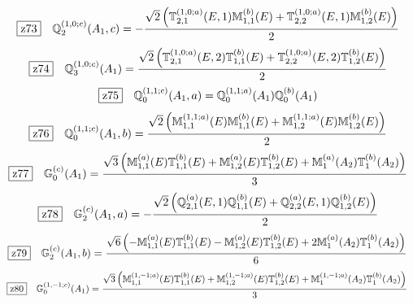 \documentclass[fleqn,10pt,landscape]{jsarticle}
\begin{document}
\begin{dmath*}
\hspace*{3mm}\fbox{z73}\quad \mathbb{Q}_{2}^{(1,0;c)}(A_{1},c)=- \frac{\sqrt{2} \left(\mathbb{T}_{2,1}^{(1,0;a)}(E,1) \mathbb{M}_{1,1}^{(b)}(E) + \mathbb{T}_{2,2}^{(1,0;a)}(E,1) \mathbb{M}_{1,2}^{(b)}(E)\right)}{2}
\end{dmath*}
\begin{dmath*}
\hspace*{3mm}\fbox{z74}\quad \mathbb{Q}_{3}^{(1,0;c)}(A_{1})=\frac{\sqrt{2} \left(\mathbb{T}_{2,1}^{(1,0;a)}(E,2) \mathbb{T}_{1,1}^{(b)}(E) + \mathbb{T}_{2,2}^{(1,0;a)}(E,2) \mathbb{T}_{1,2}^{(b)}(E)\right)}{2}
\end{dmath*}
\begin{dmath*}
\hspace*{3mm}\fbox{z75}\quad \mathbb{Q}_{0}^{(1,1;c)}(A_{1},a)=\mathbb{Q}_{0}^{(1,1;a)}(A_{1}) \mathbb{Q}_{0}^{(b)}(A_{1})
\end{dmath*}
\begin{dmath*}
\hspace*{3mm}\fbox{z76}\quad \mathbb{Q}_{0}^{(1,1;c)}(A_{1},b)=\frac{\sqrt{2} \left(\mathbb{M}_{1,1}^{(1,1;a)}(E) \mathbb{M}_{1,1}^{(b)}(E) + \mathbb{M}_{1,2}^{(1,1;a)}(E) \mathbb{M}_{1,2}^{(b)}(E)\right)}{2}
\end{dmath*}
\begin{dmath*}
\hspace*{3mm}\fbox{z77}\quad \mathbb{G}_{0}^{(c)}(A_{1})=\frac{\sqrt{3} \left(\mathbb{M}_{1,1}^{(a)}(E) \mathbb{T}_{1,1}^{(b)}(E) + \mathbb{M}_{1,2}^{(a)}(E) \mathbb{T}_{1,2}^{(b)}(E) + \mathbb{M}_{1}^{(a)}(A_{2}) \mathbb{T}_{1}^{(b)}(A_{2})\right)}{3}
\end{dmath*}
\begin{dmath*}
\hspace*{3mm}\fbox{z78}\quad \mathbb{G}_{2}^{(c)}(A_{1},a)=- \frac{\sqrt{2} \left(\mathbb{Q}_{2,1}^{(a)}(E,1) \mathbb{Q}_{1,1}^{(b)}(E) + \mathbb{Q}_{2,2}^{(a)}(E,1) \mathbb{Q}_{1,2}^{(b)}(E)\right)}{2}
\end{dmath*}
\begin{dmath*}
\hspace*{3mm}\fbox{z79}\quad \mathbb{G}_{2}^{(c)}(A_{1},b)=\frac{\sqrt{6} \left(- \mathbb{M}_{1,1}^{(a)}(E) \mathbb{T}_{1,1}^{(b)}(E) - \mathbb{M}_{1,2}^{(a)}(E) \mathbb{T}_{1,2}^{(b)}(E) + 2 \mathbb{M}_{1}^{(a)}(A_{2}) \mathbb{T}_{1}^{(b)}(A_{2})\right)}{6}
\end{dmath*}
\begin{dmath*}
\hspace*{3mm}\fbox{z80}\quad \mathbb{G}_{0}^{(1,-1;c)}(A_{1})=\frac{\sqrt{3} \left(\mathbb{M}_{1,1}^{(1,-1;a)}(E) \mathbb{T}_{1,1}^{(b)}(E) + \mathbb{M}_{1,2}^{(1,-1;a)}(E) \mathbb{T}_{1,2}^{(b)}(E) + \mathbb{M}_{1}^{(1,-1;a)}(A_{2}) \mathbb{T}_{1}^{(b)}(A_{2})\right)}{3}
\end{dmath*}
\end{document}
